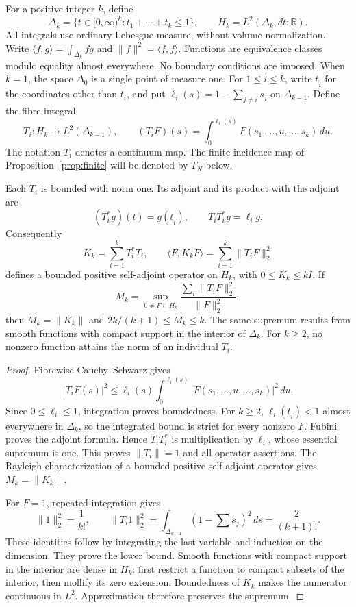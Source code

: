 \documentclass[11pt]{article}
\newcommand{\ip}[2]{\langle #1,#2\rangle}
\newcommand{\norm}[1]{\lVert #1\rVert}
\begin{document}
For a positive integer $k$, define
\[
 \Delta_k=\{t\in[0,\infty)^k:t_1+\cdots+t_k\leq1\},
 \qquad H_k=L^2(\Delta_k,dt;\mathbb R).
\]
All integrals use ordinary Lebesgue measure, without volume normalization.
Write $\ip fg=\int_{\Delta_k}fg$ and $\norm f^2=\ip ff$.
Functions are equivalence classes modulo equality almost everywhere.
No boundary conditions are imposed.  When $k=1$, the space $\Delta_0$
is a single point of measure one.  For $1\leq i\leq k$, write
$t_{\widehat i}$ for the coordinates other than $t_i$, and put
$\ell_i(s)=1-\sum_{j\ne i}s_j$ on $\Delta_{k-1}$.
Define the fibre integral
\[
 T_i:H_k\longrightarrow L^2(\Delta_{k-1}),\qquad
 (T_iF)(s)=\int_0^{\ell_i(s)}F(s_1,\ldots,u,\ldots,s_k)\,du.
\]
The notation $T_i$ denotes a continuum map.  The finite incidence map
of Proposition~\ref{prop:finite} will be denoted by $T_N$ below.

\begin{proposition}\label{prop:simplex}
Each $T_i$ is bounded with norm one.  Its adjoint and its product with
the adjoint are
\[
 (T_i^*g)(t)=g(t_{\widehat i}),\qquad T_iT_i^*g=\ell_i g.
\]
Consequently
\begin{equation}\label{eq:spine-operator}
 K_k=\sum_{i=1}^kT_i^*T_i,
 \qquad
 \langle F,K_kF\rangle=\sum_{i=1}^k\|T_iF\|_2^2
\end{equation}
defines a bounded positive self-adjoint operator on $H_k$, with
$0\leq K_k\leq kI$.  If
\[
 M_k=\sup_{0\ne F\in H_k}
       \frac{\sum_i\|T_iF\|_2^2}{\|F\|_2^2},
\]
then $M_k=\|K_k\|$ and $2k/(k+1)\leq M_k\leq k$.
The same supremum results from smooth functions with compact support
in the interior of $\Delta_k$.
For $k\geq2$, no nonzero function attains the norm of an individual $T_i$.
\end{proposition}

\begin{proof}
Fibrewise Cauchy--Schwarz gives
\[
 |T_iF(s)|^2\leq\ell_i(s)
       \int_0^{\ell_i(s)}|F(s_1,\ldots,u,\ldots,s_k)|^2\,du.
\]
Since $0\leq\ell_i\leq1$, integration proves boundedness.
For $k\geq2$, $\ell_i(t_{\widehat i})<1$ almost everywhere in
$\Delta_k$, so the integrated bound is strict for every nonzero $F$.
Fubini proves the adjoint formula.  Hence $T_iT_i^*$ is multiplication
by $\ell_i$, whose essential supremum is one.  This proves
$\|T_i\|=1$ and all operator assertions.
The Rayleigh characterization of a bounded positive self-adjoint operator
gives $M_k=\|K_k\|$.

For $F=1$, repeated integration gives
\[
 \|1\|_2^2=\frac1{k!},\qquad
 \|T_i1\|_2^2=\int_{\Delta_{k-1}}(1-\textstyle\sum s_j)^2\,ds
                  =\frac2{(k+1)!}.
\]
These identities follow by integrating the last variable and induction
on the dimension.  They prove the lower bound.
Smooth functions with compact support in the interior are dense in $H_k$:
first restrict a function to compact subsets of the interior, then mollify
its zero extension.  Boundedness of $K_k$ makes the numerator continuous
in $L^2$.  Approximation therefore preserves the supremum.
\end{proof}
\end{document}
